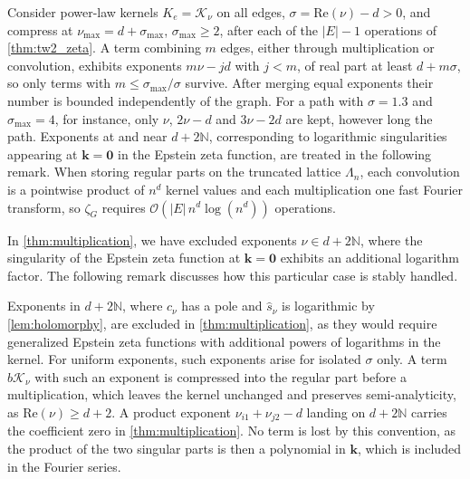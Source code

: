 \documentclass[]{amsart}
\numberwithin{mythm}{section}
\begin{document}
\begin{remark}
\label{rem:sp_cost}
Consider power-law kernels $K_e=\mathcal K_\nu$ on all edges, $\sigma=\mathrm{Re}(\nu)-d>0$, and compress at
$\nu_{\mathrm{max}}=d+\sigma_{\mathrm{max}}$, $\sigma_{\mathrm{max}}\ge2$, after each of the
$|E|-1$ operations of \cref{thm:tw2_zeta}. A term combining $m$ edges, either through multiplication or convolution, exhibits exponents
$m\nu-jd$ with $j<m$, of real part at least $d+m\sigma$, so only terms with
$m\le\sigma_{\mathrm{max}}/\sigma$ survive. After merging equal exponents their number is
bounded independently of the graph. For a path with $\sigma=1.3$ and
$\sigma_{\mathrm{max}}=4$, for instance, only $\nu$, $2\nu-d$ and $3\nu-2d$ are kept, however long the
path. Exponents at and near $d+2\mathds N$, corresponding to logarithmic singularities appearing at $\bm k=\bm 0$ in the Epstein zeta function, are treated in the following remark. When storing regular parts on the truncated lattice
$\Lambda_n$, each convolution is a pointwise product of $n^d$ kernel values and each
multiplication one fast Fourier transform, so $\zeta_G$ requires
$\mathcal O(|E|\,n^d\log (n^d))$ operations.
\end{remark}

In \cref{thm:multiplication}, we have excluded exponents $\nu\in d+2\mathds N$, where the singularity of the Epstein zeta function at $\bm k=\bm 0$ exhibits an additional logarithm factor. The following remark discusses how this particular case is stably handled.

\begin{remark}
\label{rem:pole_family}
Exponents in $d+2\mathds N$, where $c_\nu$ has a pole and $\hat s_\nu$ is logarithmic by \cref{lem:holomorphy}, are excluded in \cref{thm:multiplication}, as they would require generalized Epstein zeta functions with additional powers of logarithms in the kernel. For uniform exponents, such exponents arise for isolated $\sigma$ only. A term $b\mathcal K_\nu$ with such an exponent is compressed into the regular part before a multiplication, which leaves the kernel unchanged and preserves semi-analyticity, as $\mathrm{Re}(\nu)\ge d+2$. A product exponent $\nu_{i1}+\nu_{j2}-d$ landing on $d+2\mathds N$ carries the coefficient zero in \cref{thm:multiplication}. No term is lost by this convention, as the product of the two singular parts is then a polynomial in $\bm k$, which is included in the Fourier series.
\end{remark}
\end{document}
